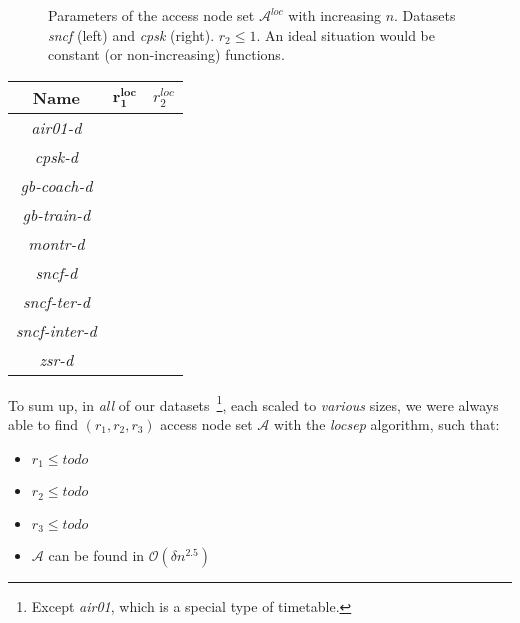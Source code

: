		\begin{figure}[h!]
		\centering
	    \caption{\label{plot:locsep-size} Parameters of the access node set $\mathcal{A}^{loc}$ with increasing $n$. Datasets \textit{sncf} (left) and \textit{cpsk} (right). $r_{2} \leq 1$. An ideal situation would be constant (or non-increasing) functions.}
		\end{figure}	
		
		\begin{table}[H]
			\centering 
			\begin{tabular}{c|c|c}
				\rowcolor{tablehead}
				\textbf{Name} & $\bm{r^{loc}_{1}}$ & $r^{loc}_{2}$ \\
				\hline
				\textit{air01-d} &  &  \\
				\textit{cpsk-d} &  &  \\
				\textit{gb-coach-d} &  &  \\
				\textit{gb-train-d} &  &  \\
				\textit{montr-d} &  &  \\
				\textit{sncf-d} &  &  \\
				\textit{sncf-ter-d} &  &  \\
				\textit{sncf-inter-d} &  &  \\
				\textit{zsr-d} &  &  \\
			\end{tabular}
			\label{tab:locsep}
		\end{table}					
		
		\noindent To sum up, in \textit{all} of our datasets~\footnote{Except \textit{air01}, which is a special type of timetable.}, each scaled to \textit{various} sizes, we were always able to find $(r_{1}, r_{2}, r_{3})$ access node set $\mathcal{A}$ with the \textit{locsep} algorithm, such that:
		\begin{itemize}
			\item $r_{1} \leq todo$
			\item $r_{2} \leq todo$
			\item $r_{3} \leq todo$
			\item $\mathcal{A}$ can be found in $\mathcal{O}(\delta n^{2.5})$
		\end{itemize}
		\hspace*{\fill}
		

